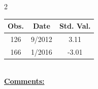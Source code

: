 
\bigskip 
\begin{multicols}{2}{ 
\begin{tabular}{ccc}
\hline  Obs.  &  Date &  Std. Val. \\ 
\hline 
                      126 &        9/2012 &          3.11 \vspace{-.12in} \\  
                      166 &        1/2016 &         -3.01 \vspace{-.12in} \\  
 \end{tabular} 
\\ 
 \columnbreak 
 \singlespacing 
 \underline{\textbf{Comments:}} \\ 
 \bigskip       

 } 
\end{multicols} 
